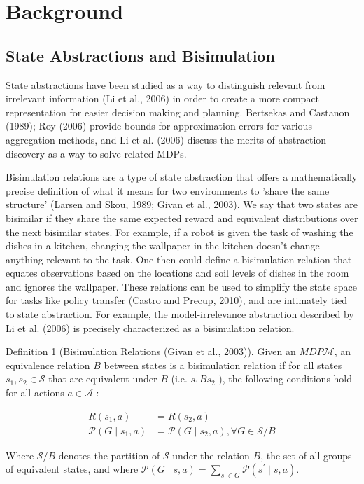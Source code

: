 \documentclass[10pt]{article}
\begin{document}
\section{Background}
\subsection{State Abstractions and Bisimulation}
State abstractions have been studied as a way to distinguish relevant from irrelevant information (Li et al., 2006) in order to create a more compact representation for easier decision making and planning. Bertsekas and Castanon (1989); Roy (2006) provide bounds for approximation errors for various aggregation methods, and Li et al. (2006) discuss the merits of abstraction discovery as a way to solve related MDPs.

Bisimulation relations are a type of state abstraction that offers a mathematically precise definition of what it means for two environments to 'share the same structure' (Larsen and Skou, 1989; Givan et al., 2003). We say that two states are bisimilar if they share the same expected reward and equivalent distributions over the next bisimilar states. For example, if a robot is given the task of washing the dishes in a kitchen, changing the wallpaper in the kitchen doesn't change anything relevant to the task. One then could define a bisimulation relation that equates observations based on the locations and soil levels of dishes in the room and ignores the wallpaper. These relations can be used to simplify the state space for tasks like policy transfer (Castro and Precup, 2010), and are intimately tied to state abstraction. For example, the model-irrelevance abstraction described by Li et al. (2006) is precisely characterized as a bisimulation relation.

Definition 1 (Bisimulation Relations (Givan et al., 2003)). Given an $M D P \mathcal{M}$, an equivalence relation $B$ between states is a bisimulation relation if for all states $s_{1}, s_{2} \in \mathcal{S}$ that are equivalent under $B$ (i.e. $s_{1} B s_{2}$ ), the following conditions hold for all actions $a \in \mathcal{A}$ :

\[
\begin{aligned}
R\left(s_{1}, a\right) & =R\left(s_{2}, a\right) \\
\mathcal{P}\left(G \mid s_{1}, a\right) & =\mathcal{P}\left(G \mid s_{2}, a\right), \forall G \in \mathcal{S} / B
\end{aligned}
\]

Where $\mathcal{S} / B$ denotes the partition of $\mathcal{S}$ under the relation $B$, the set of all groups of equivalent states, and where $\mathcal{P}(G \mid s, a)=\sum_{s^{\prime} \in G} \mathcal{P}\left(s^{\prime} \mid s, a\right)$.
\end{document}
